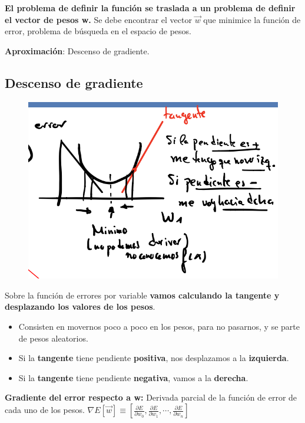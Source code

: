 \documentclass[12pt, twoside, openright]{report} %
\begin{document}
\textbf{El problema de definir la función se traslada a un problema de
definir el vector de pesos w.} Se debe encontrar el vector \(\vec{w}\)
que minimice la función de error, problema de búsqueda en el espacio de
pesos.

\textbf{Aproximación}: Descenso de gradiente.

\subsection{Descenso de gradiente}
\begin{figure}[H]
	{\includegraphics[scale=.3]{image-20210305214445428.png}}
\end{figure}
Sobre la función de errores por variable \textbf{vamos calculando la tangente y desplazando los valores de los pesos}.

\begin{itemize}

\item
  Consisten en movernos poco a poco en los pesos, para no pasarnos, y se parte de pesos aleatorios.
\item
  Si la \textbf{tangente} tiene pendiente \textbf{positiva}, nos
  desplazamos a la \textbf{izquierda}.
\item
  Si la \textbf{tangente} tiene pendiente \textbf{negativa}, vamos a la
  \textbf{derecha}.
\end{itemize}

\textbf{Gradiente del error respecto a w:} Derivada parcial de la
función de error de cada uno de los pesos.
\(\nabla E[\vec{w}] \equiv\left[\frac{\partial E}{\partial w_{0}}, \frac{\partial E}{\partial w_{1}}, \cdots ,\frac{\partial E}{\partial w_{n}}\right]\)
\end{document}
